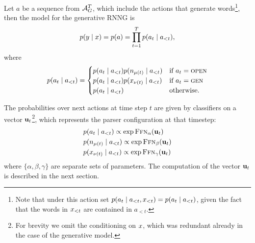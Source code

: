 Let $a$ be a sequence from $\mathcal{A}_G^T$, which include the actions that generate words\footnote{Note that under this action set $p(a_t \mid a_{<t}, x_{<t}) = p(a_t \mid a_{<t})$, given the fact that the words in $x_{<t}$ are contained in $a_{<t}$.}, then the model for the generative RNNG is
\begin{align}
  \label{eq:disc-model}
  p(y \mid x) = p(a) = \prod_{t=1}^T p( a_t \mid a_{<t}),
\end{align}
where
\begin{equation}
  \label{eq:gen-model}
  p( a_t \mid a_{<t} ) =
  \begin{cases}
    p( a_t \mid a_{<t} ) p(n_{ \mu(t) } \mid a_{<t} ) & \text{if } a_t = \textsc{open}  \\
    p( a_t \mid a_{<t} ) p(x_{ \nu(t) } \mid a_{<t} ) & \text{if } a_t = \textsc{gen}  \\
    p( a_t \mid a_{<t} ) & \text{otherwise.}  \\
  \end{cases}
\end{equation}

The probabilities over next actions at time step $t$ are given by classifiers on a vector $\mathbf{u}_t$\footnote{For brevity we omit the conditioning on $x$, which was redundant already in the case of the generative model.}, which represents the parser configuration at that timestep:
\begin{align}
  \label{eq:action-regression}
  &p(a_t \mid a_{<t})
    \propto \exp \textsc{Ffn}_{\alpha}( \mathbf{u}_t )  \\
  &p(n_{\mu(t)} \mid a_{<t})
    \propto \exp \textsc{Ffn}_{\beta}( \mathbf{u}_t )  \\
  &p(x_{\nu(t)} \mid a_{<t})
    \propto \exp \textsc{Ffn}_{\gamma}( \mathbf{u}_t )
\end{align}
where $\{\alpha, \beta, \gamma\}$ are separate sets of parameters. The computation of the vector $\mathbf{u}_t$ is described in the next section.


